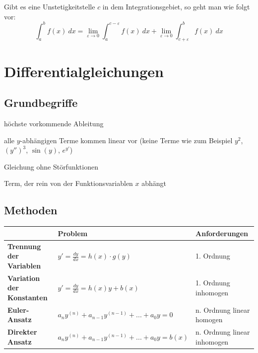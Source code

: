 \documentclass[11pt]{article}
\begin{document}
Gibt es eine Unstetigkeitstelle $c$ in dem Integrationsgebiet, so geht man wie folgt vor:
\begin{equation*}
	\int_a^b f(x)\ dx = \lim_{\varepsilon \to 0} \int_a^{c-\varepsilon} f(x)\ dx + \lim_{\varepsilon \to 0} \int_{c+\varepsilon}^b f(x)\ dx
\end{equation*}

\section{Differentialgleichungen}

\subsection{Grundbegriffe}

\begin{description}[labelindent=16pt,style=multiline,leftmargin=3.5cm, noitemsep]
	\item[Ordnung:] h{\"o}chste vorkommende Ableitung
	\item[linear:] alle $y$-abh{\"a}ngigen Terme kommen linear vor (keine Terme wie zum Beispiel $y^2$, $(y'')^3$, $\sin(y)$, $e^{y'}$)
	\item[homogen:] Gleichung ohne St{\"o}rfunktionen
	\item[St{\"o}rfunktion:] Term, der rein von der Funktionsvariablen $x$ abh{\"a}ngt
\end{description}

\subsection{Methoden}

\begin{table}[H]
\centering
\begin{tabular}{|p{5cm}|p{6cm}|p{3cm}|}
\hline
                                  	& \textbf{Problem} 							& \textbf{Anforderungen} 			\\ \hline
\textbf{Trennung der Variablen}   	& $y' = \frac{dy}{dx} = h(x) \cdot g(y)$ 	& 1. Ordnung			            \\ \hline
\textbf{Variation der Konstanten}	& $y' = \frac{dy}{dx} = h(x)y + b(x)$	 	& 1. Ordnung \filbreak inhomogen	\\ \hline
\textbf{Euler-Ansatz}				& $a_{n}y^{(n)} + a_{n-1}y^{(n-1)} + ... + a_{0}y = 0$	 	& n. Ordnung \filbreak linear \filbreak homogen	\\ \hline
\textbf{Direkter Ansatz}				& $a_{n}y^{(n)} + a_{n-1}y^{(n-1)} + ... + a_{0}y = b(x)$	& n. Ordnung \filbreak linear \filbreak inhomogen	\\ \hline

\end{tabular}
\end{table}
\end{document}
